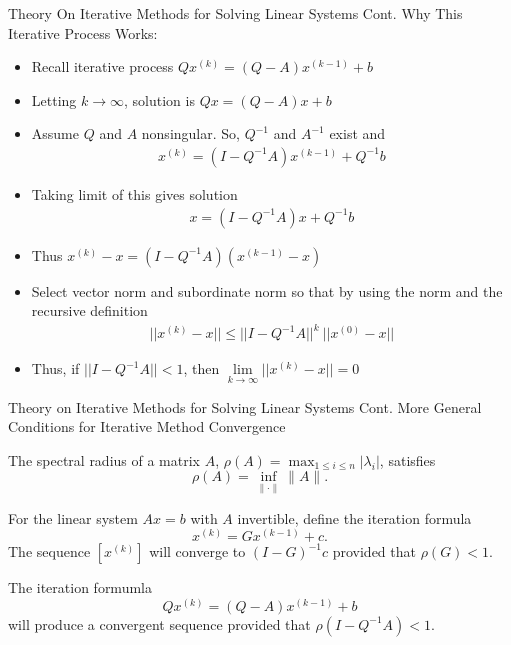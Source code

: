 \documentclass[9pt, serif]{beamer}
\newlength{\wideitemsep}
\let\olditem\item
\renewcommand{\item}{\setlength{\itemsep}{\wideitemsep}\olditem}
\newcommand{\bi}{\begin{itemize}}
\newcommand{\ei}{\end{itemize}}
\newcommand{\abs}[1]{\lvert#1\rvert}
\newcommand{\norm}[1]{\lVert#1\rVert}
\begin{document}
\begin{frame}{Theory On Iterative Methods for Solving Linear Systems Cont.}
    \pause
    Why This Iterative Process Works: \pause
    \bi
        \item Recall iterative process $Qx^{(k)} = (Q - A)x^{(k-1)} + b$ \pause
        \item Letting $k\rightarrow\infty$, solution is $Qx = (Q - A)x + b$ \pause
        \item Assume $Q$ and $A$ nonsingular. So, $Q^{-1}$ and $A^{-1}$ exist and
	    \begin{align*}
	        x^{(k)} = (I - Q^{-1}A)x^{(k-1)} + Q^{-1}b
	    \end{align*}
        \vspace{-3mm}
        \pause
        \item Taking limit of this gives solution
	    \begin{align*}
	        x = (I-Q^{-1}A)x+Q^{-1}b
	    \end{align*}
        \vspace{-3mm}
        \pause


        \item Thus $x^{(k)} - x = (I-Q^{-1}A)(x^{(k-1)}-x)$ \pause
        \item Select vector norm and subordinate norm so that by using the norm and the recursive definition
	    \begin{align*}
	        ||x^{(k)} - x|| \leq || I -Q^{-1}A||^k~||x^{(0)}-x||
	    \end{align*}
        \vspace{-3mm}
        \pause
        \item Thus, if $|| I - Q^{-1}A|| < 1$, then $\lim\limits_{k\rightarrow\infty} ||x^{(k)} - x || = 0$ 
    \ei
\end{frame}


\begin{frame}{Theory on Iterative Methods for Solving Linear Systems Cont.}
    More General Conditions for Iterative Method Convergence \pause
    \begin{theorem}
        The spectral radius of a matrix $A$, $\rho(A) = \max_{1\le i\le n}\abs{\lambda_i}$, satisfies $$\rho(A) = \inf_{\norm{\cdot}}\norm{A}.$$
    \end{theorem} 
    \pause
    \begin{theorem}
        For the linear system $Ax = b$ with $A$ invertible, define the iteration formula $$x^{(k)} = Gx^{(k-1)} + c.$$
        The sequence $\left[x^{(k)}\right]$ will converge to $(I - G)^{-1}c$ provided that $\rho(G) < 1$.
    \end{theorem}
    \pause
    \begin{corollary}
        The iteration formumla $$Qx^{(k)} = (Q-A)x^{(k-1)}+b$$ will produce a convergent sequence provided that $\rho(I-Q^{-1}A) < 1$.
    \end{corollary} 
\end{frame}
\end{document}
